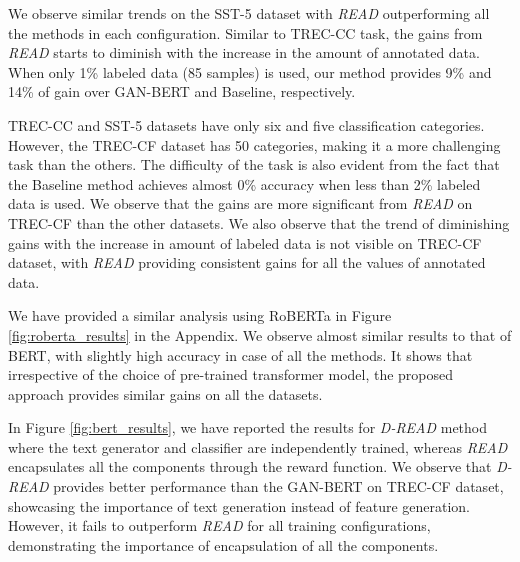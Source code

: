 \documentclass[11pt]{article}
\begin{document}
We observe similar trends on the SST-5 dataset with \textit{READ} outperforming all the methods in each configuration. Similar to TREC-CC task, the gains from \textit{READ} starts to diminish with the increase in the amount of annotated data. When only 1\% labeled data (85 samples) is used, our method provides 9\% and 14\% of gain over GAN-BERT and Baseline, respectively. 

TREC-CC and SST-5 datasets have only six and five classification categories. However, the TREC-CF dataset has 50 categories, making it a more challenging task than the others. The difficulty of the task is also evident from the fact that the Baseline method achieves almost 0\% accuracy when less than 2\% labeled data is used. We observe that the gains are more significant from \textit{READ} on TREC-CF than the other datasets. We also observe that the trend of diminishing gains with the increase in amount of labeled data is not visible on TREC-CF dataset, with \textit{READ} providing consistent gains for all the values of annotated data.

We have provided a similar analysis using RoBERTa in Figure \ref{fig:roberta_results} in the Appendix. We observe almost similar results to that of BERT, with slightly high accuracy in case of all the methods. It shows that irrespective of the choice of pre-trained transformer model, the proposed approach provides similar gains on all the datasets.

In Figure \ref{fig:bert_results}, we have reported the results for \textit{{D-READ}} method where the text generator and classifier are independently trained, whereas \textit{READ} encapsulates all the components through the reward function. We observe that \textit{D-READ} provides better performance than the GAN-BERT on TREC-CF dataset, showcasing the importance of text generation instead of feature generation. However, it fails to outperform \textit{READ} for all training configurations, demonstrating the importance of encapsulation of all the components.

\end{document}
